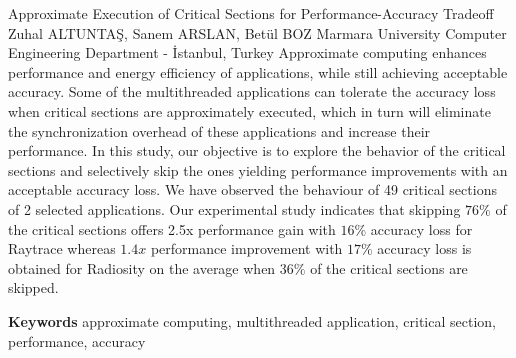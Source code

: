 
    \begin{abstract_online}{Approximate Execution of Critical Sections for Performance-Accuracy Tradeoff}{%
        Zuhal ALTUNTAŞ, Sanem ARSLAN, Betül BOZ}{%
        }{%
        Marmara University Computer Engineering Department - İstanbul, Turkey}
    Approximate computing enhances performance and energy efficiency of applications, while still achieving acceptable accuracy. Some of the multithreaded applications can tolerate the accuracy loss when critical sections are approximately executed, which in turn will eliminate the synchronization overhead of these applications and increase their performance. In this study, our objective is to explore the behavior of the critical sections and selectively skip the ones yielding performance improvements with an acceptable accuracy loss. We have observed the behaviour of 49 critical sections of 2 selected applications. Our experimental study indicates that skipping $76 \%$ of the critical sections offers 2.5x performance gain with $16 \%$ accuracy loss for Raytrace whereas $1.4 x$ performance improvement with $17 \%$ accuracy loss is obtained for Radiosity on the average when $36 \%$ of the critical sections are skipped. 
    
        \textbf{Keywords} \newline{}approximate computing, multithreaded application, critical section, performance, accuracy
    \end{abstract_online}
    